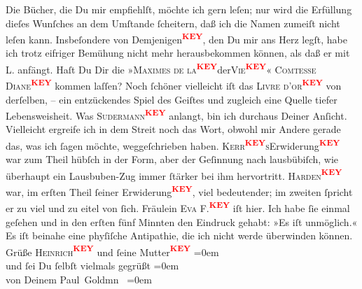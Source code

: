 \begin{ledgroupsized}[t]{13cm}
           \pstart
           Die Bücher, die Du mir empfiehlſt, möchte ich gern leſen; nur wird die Erfüllung
                    dieſes Wunſches an dem Umſtande ſcheitern, daß ich die Namen zumeiſt nicht leſen
                    kann. Insbeſondere von Demjenigen\textcolor{red}{\textsuperscript{\textbf{KEY}}}, den Du mir ans
                    Herz legſt, habe ich trotz eifriger Bemühung nicht mehr herausbekommen können,
                    als daß er mit \textsc{L.}{\pb} anfängt. \pend
           \pstart
           Haſt Du Dir die »\textsc{Maximes de la\textcolor{red}{\textsuperscript{\textbf{KEY}}}}der\textsc{Vie\textcolor{red}{\textsuperscript{\textbf{KEY}}}}« \textsc{}\textsc{Comtesse Diane\textcolor{red}{\textsuperscript{\textbf{KEY}}}} kommen laſſen? Noch ſchöner vielleicht iſt das \textsc{Livre d’or\textcolor{red}{\textsuperscript{\textbf{KEY}}}} von derſelben, – ein entzückendes Spiel des Geiſtes und zugleich eine
                    Quelle tiefer Lebensweisheit. \pend
           \pstart
           Was \textsc{Sudermann\textcolor{red}{\textsuperscript{\textbf{KEY}}}} anlangt, bin ich durchaus Deiner Anſicht. Vielleicht ergreife ich in dem
                    Streit noch das Wort, obwohl mir Andere gerade das, was ich ſagen möchte,
                    weggeſchrieben {\pb} haben. \textsc{Kerr\textcolor{red}{\textsuperscript{\textbf{KEY}}}s}Erwiderung\textcolor{red}{\textsuperscript{\textbf{KEY}}} war zum Theil hübſch in der Form, aber
                    der Geſinnung nach lausbübiſch, wie überhaupt ein Lausbuben-Zug immer ſtärker
                    bei ihm hervortritt. \textsc{Harden\textcolor{red}{\textsuperscript{\textbf{KEY}}}} war, im erſten Theil ſeiner Erwiderung\textcolor{red}{\textsuperscript{\textbf{KEY}}}, viel
                    bedeutender; im zweiten ſpricht er zu viel und zu eitel von ſich. \pend
           \pstart
           Fräulein \textsc{Eva F.\textcolor{red}{\textsuperscript{\textbf{KEY}}}} iſt hier. Ich habe ſie einmal geſehen und in den erſten fünf Minnten den
                    Eindruck gehabt: »Es iſt unmöglich.« Es iſt beinahe eine phyſiſche Antipathie,
                    die ich nicht werde überwinden können. {\\[\baselineskip]}Grüße \textsc{Heinrich\textcolor{red}{\textsuperscript{\textbf{KEY}}}} und ſeine Mutter\textcolor{red}{\textsuperscript{\textbf{KEY}}}\pend
           \leftskip=0em{}\pstart
           {\\[\baselineskip]}und ſei Du ſelbſt vielmals gegrüßt\pend
           \leftskip=0em{}\pstart
           {\\[\baselineskip]}von Deinem \spacefill\mbox{Paul Goldmn }\pend
           \leftskip=0em{}
         
         \endnumbering{}\end{ledgroupsized}\begin{anhang}\end{anhang}\newcommand{\dateiname}{L03230}\newcommand{\titel}{Paul Goldmann an Arthur Schnitzler, 24. 11. [1902]}\newcommand{\editorInnen}{Martin Anton Müller und Laura Untner}
      